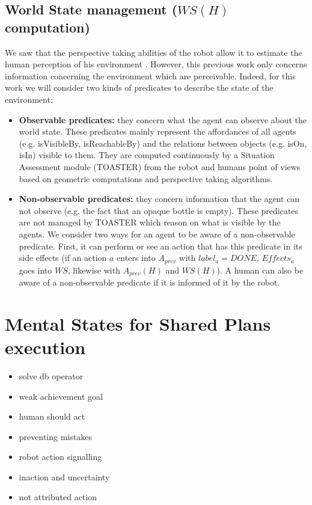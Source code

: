 \documentclass[english,a4paper,11pt,twoside]{StyleThese}
\begin{document}
\subsection{World State management ($WS(H)$ computation)}
\label{subsec:worldstate}

We saw that the perspective taking abilities of the robot allow it to estimate the human perception of his environment \cite{milliez2014framework}. However, this previous work only concerns information concerning the environment which are perceivable. Indeed, for this work we will consider two kinds of predicates to describe the state of the environment:
\begin{itemize}
\item \textbf{Observable predicates:} they concern what the agent can observe about the world state. These predicates mainly represent the affordances of all agents (e.g. isVisibleBy, isReachableBy) and the relations between objects (e.g. isOn, isIn) visible to them. They are computed continuously by a Situation Assessment module (TOASTER) from the robot and humans point of views based on geometric computations and perspective taking algorithms.
\item \textbf{Non-observable predicates:} they concern information that the agent can not observe (e.g. the fact that an opaque bottle is empty). These predicates are not managed by TOASTER which reason on what is visible by the agents. We consider two ways for an agent to be aware of a non-observable predicate. First, it can perform or see an action that has this predicate in its side effects (if an action $a$ enters into $A_{prev}$ with $label_{a}  = DONE$, $Effects_{a}$ goes into $WS$, likewise with $A_{prev}(H)$ and $WS(H)$). A human can also be aware of a non-observable predicate if it is informed of it by the robot.
\end{itemize}


\section{Mental States for Shared Plans execution}

\begin{itemize}
\item solve db operator
\item weak achievement goal
\item human should act
\item preventing mistakes
\item robot action signalling
\item inaction and uncertainty
\item not attributed action
\end{itemize}
\end{document}
